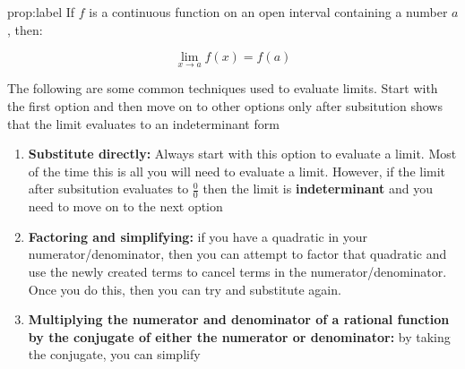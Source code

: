 \documentclass{package/notes}
\begin{document}
\begin{proposition}{prop:label}
	If $f$ is a continuous function on an open interval containing a number $a$, then:

	$$\lim_{x \to a} f(x) = f(a)$$
\end{proposition}

The following are some common techniques used to evaluate limits. Start with the first option and then move on to other options only after subsitution shows that the limit evaluates to an indeterminant form 

\begin{enumerate}
	\item \textbf{Substitute directly:} Always start with this option to evaluate a limit. Most of the time this is all you will need to evaluate a limit. However, if the limit after subsitution evaluates to $\frac{0}{0}$ then the limit is \textbf{indeterminant} and you need to move on to the next option
	\item \textbf{Factoring and simplifying:} if you have a quadratic in your numerator/denominator, then you can attempt to factor that quadratic and use the newly created terms to cancel terms in the numerator/denominator. Once you do this, then you can try and substitute again. 
	\item \textbf{Multiplying the numerator and denominator of a rational function by the conjugate of either the numerator or denominator:} by taking the conjugate, you can simplify 
\end{enumerate}
	
\end{document}
